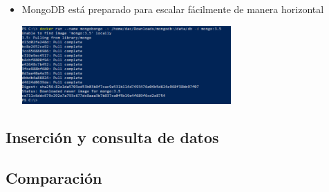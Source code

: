 \documentclass[%
 reprint,
 amsmath,amssymb,
 aps,
]{revtex4-1}
\begin{document}
\begin{itemize}
\begin{center}
		\end{center}	
                     \item MongoDB está preparado para escalar fácilmente de manera horizontal
                     \begin{center}
		\includegraphics[width=8cm]{./Imagenes/7}
		\end{center}	
	          \end{itemize}
\subsection{Inserción y consulta de datos}
\subsection{Comparación}
\end{document}
